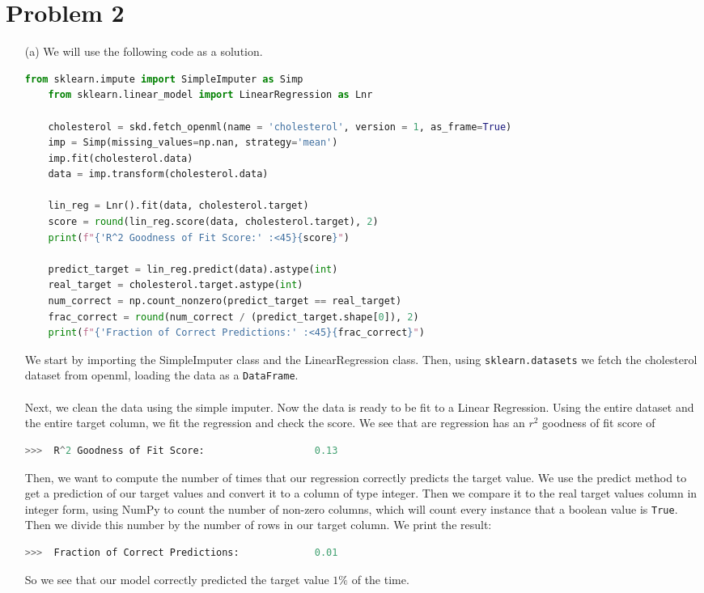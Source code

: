 \documentclass[12pt, letterpaper]{article}
\begin{document}
\section*{Problem 2}
\begin{enumerate}
    \item [(a)] We will use the following code as a solution.
\begin{lstlisting}[language=python]
    from sklearn.impute import SimpleImputer as Simp
    from sklearn.linear_model import LinearRegression as Lnr

    cholesterol = skd.fetch_openml(name = 'cholesterol', version = 1, as_frame=True)
    imp = Simp(missing_values=np.nan, strategy='mean')
    imp.fit(cholesterol.data)
    data = imp.transform(cholesterol.data)

    lin_reg = Lnr().fit(data, cholesterol.target)
    score = round(lin_reg.score(data, cholesterol.target), 2)
    print(f"{'R^2 Goodness of Fit Score:' :<45}{score}")

    predict_target = lin_reg.predict(data).astype(int)
    real_target = cholesterol.target.astype(int)
    num_correct = np.count_nonzero(predict_target == real_target)
    frac_correct = round(num_correct / (predict_target.shape[0]), 2)
    print(f"{'Fraction of Correct Predictions:' :<45}{frac_correct}")
\end{lstlisting}
    We start by importing the SimpleImputer class and the LinearRegression class. Then, using 
    \texttt{sklearn.datasets} we fetch the cholesterol dataset from openml, loading the data as 
    a \texttt{DataFrame}. \\ \\
    Next, we clean the data using the simple imputer. Now the data is ready to be fit to a Linear 
    Regression. Using the entire dataset and the entire target column, we fit the regression and 
    check the score. We see that are regression has an $r^2$ goodness of fit score of 
\begin{lstlisting}[language=python]
    >>>  R^2 Goodness of Fit Score:                   0.13
\end{lstlisting}
    Then, we want to compute the number of times that our regression correctly predicts the target value. 
    We use the predict method to get a prediction of our target values and convert it to a column of 
    type integer. Then we compare it to the real target values column in integer form, using NumPy to 
    count the number of non-zero columns, which will count every instance that a boolean value is 
    \texttt{True}. Then we divide this number by the number of rows in our target column. We print 
    the result:
\begin{lstlisting}[language=python]
    >>>  Fraction of Correct Predictions:             0.01
\end{lstlisting}
    So we see that our model correctly predicted the target value $1\%$ of the time.


\end{enumerate}
\end{document}
